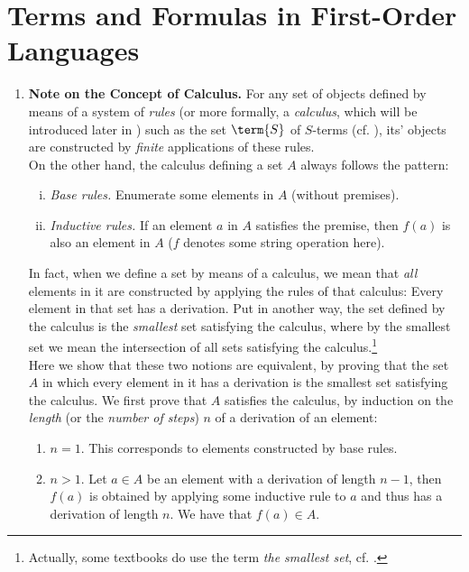 \section{Terms and Formulas in First-Order Languages}
\begin{enumerate}[1.]
%
\item \textbf{Note on the Concept of Calculus.} For any set of objects defined by means of a system of \emph{rules} (or more formally, a \emph{calculus}, which will be introduced later in ) such as the set $\term{S}$ of $S$-terms (cf. ), its' objects are constructed by \emph{finite} applications of these rules.\newline
\\
On the other hand, the calculus defining a set $A$ always follows the pattern:
\begin{enumerate}[(i)]
\item \textit{Base rules.} Enumerate some elements in $A$ (without premises).
\item \textit{Inductive rules.} If an element $a$ in $A$ satisfies the premise, then $f(a)$ is also an element in $A$ ($f$ denotes some string operation here).
\end{enumerate}
In fact, when we define a set by means of a calculus, we mean that \emph{all} elements in it are constructed by applying the rules of that calculus: Every element in that set has a derivation. Put in another way, the set defined by the calculus is the \emph{smallest} set satisfying the calculus, where by the smallest set we mean the intersection of all sets satisfying the calculus.\footnote{Actually, some textbooks do use the term \emph{the smallest set}, cf. \cite{Dirk_van_Dalen}.}\newline
\\
Here we show that these two notions are equivalent, by proving that the set $A$ in which every element in it has a derivation is the smallest set satisfying the calculus. We first prove that $A$ satisfies the calculus, by induction on the \emph{length} (or the \emph{number of steps}) $n$ of a derivation of an element:
\begin{enumerate}[(1)]
\item $n = 1$. This corresponds to elements constructed by base rules.
\item $n > 1$. Let $a \in A$ be an element with a derivation of length $n - 1$, then $f(a)$ is obtained by applying some inductive rule to $a$ and thus has a derivation of length $n$. We have that $f(a) \in A$.

\end{enumerate}
\end{enumerate}
